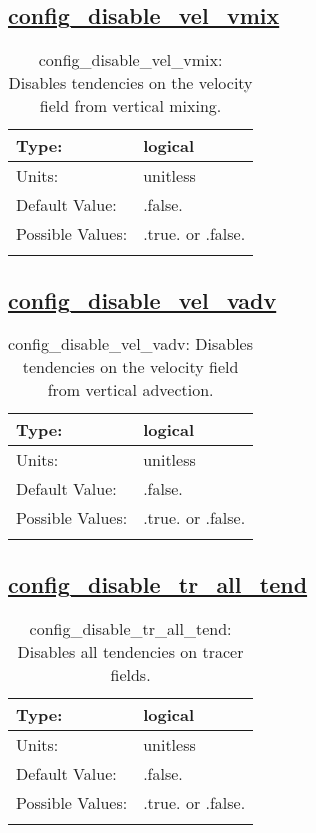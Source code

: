 \subsection[config\_disable\_vel\_vmix]{\hyperref[sec:nm_tab_debug]{config\_disable\_vel\_vmix}}
\label{subsec:nm_sec_config_disable_vel_vmix}
\begin{center}
\begin{longtable}{| p{2.0in} || p{4.0in} |}
    \hline
    Type: & logical \\
    \hline
    Units: & \si{unitless} \\
    \hline
    Default Value: & .false. \\
    \hline
    Possible Values: & .true. or .false. \\
    \hline
    \caption{config\_disable\_vel\_vmix: Disables tendencies on the velocity field from vertical mixing.}
\end{longtable}
\end{center}
\subsection[config\_disable\_vel\_vadv]{\hyperref[sec:nm_tab_debug]{config\_disable\_vel\_vadv}}
\label{subsec:nm_sec_config_disable_vel_vadv}
\begin{center}
\begin{longtable}{| p{2.0in} || p{4.0in} |}
    \hline
    Type: & logical \\
    \hline
    Units: & \si{unitless} \\
    \hline
    Default Value: & .false. \\
    \hline
    Possible Values: & .true. or .false. \\
    \hline
    \caption{config\_disable\_vel\_vadv: Disables tendencies on the velocity field from vertical advection.}
\end{longtable}
\end{center}
\subsection[config\_disable\_tr\_all\_tend]{\hyperref[sec:nm_tab_debug]{config\_disable\_tr\_all\_tend}}
\label{subsec:nm_sec_config_disable_tr_all_tend}
\begin{center}
\begin{longtable}{| p{2.0in} || p{4.0in} |}
    \hline
    Type: & logical \\
    \hline
    Units: & \si{unitless} \\
    \hline
    Default Value: & .false. \\
    \hline
    Possible Values: & .true. or .false. \\
    \hline
    \caption{config\_disable\_tr\_all\_tend: Disables all tendencies on tracer fields.}
\end{longtable}
\end{center}
